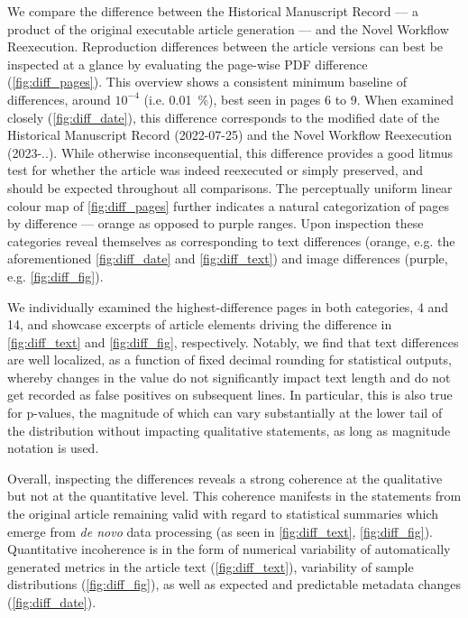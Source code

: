 We compare the difference between the Historical Manuscript Record — a product of the original executable article generation — and the Novel Workflow Reexecution.
Reproduction differences between the article versions can best be inspected at a glance by evaluating the page-wise PDF difference (\ref{fig:diff_pages}).
This overview shows a consistent minimum baseline of differences, around $10^{-4}$ (i.e. \SI{0.01}{\percent}), best seen in pages 6 to 9.
When examined closely (\ref{fig:diff_date}), this difference corresponds to the modified date of the Historical Manuscript Record (2022-07-25) and the Novel Workflow Reexecution (2023-..).
While otherwise inconsequential, this difference provides a good litmus test for whether the article was indeed reexecuted or simply preserved, and should be expected throughout all comparisons.
The perceptually uniform linear colour map of \cref{fig:diff_pages} further indicates a natural categorization of pages by difference — orange as opposed to purple ranges.
Upon inspection these categories reveal themselves as corresponding to text differences (orange, e.g. the aforementioned \cref{fig:diff_date} and \cref{fig:diff_text}) and image differences (purple, e.g. \cref{fig:diff_fig}).

We individually examined the highest-difference pages in both categories, 4 and 14, and showcase excerpts of article elements driving the difference in \cref{fig:diff_text} and \cref{fig:diff_fig}, respectively.
Notably, we find that text differences are well localized, as a function of fixed decimal rounding for statistical outputs, whereby changes in the value do not significantly impact text length and do not get recorded as false positives on subsequent lines.
In particular, this is also true for p-values, the magnitude of which can vary substantially at the lower tail of the distribution without impacting qualitative statements, as long as magnitude notation is used.


Overall, inspecting the differences reveals a strong coherence at the qualitative but not at the quantitative level.
This coherence manifests in the statements from the original article remaining valid with regard to statistical summaries which emerge from  \textit{de novo} data processing (as seen in \ref{fig:diff_text}, \ref{fig:diff_fig}).
Quantitative incoherence is in the form of numerical variability of automatically generated metrics in the article text (\ref{fig:diff_text}), variability of sample distributions (\ref{fig:diff_fig}), as well as expected and predictable metadata changes (\ref{fig:diff_date}).


